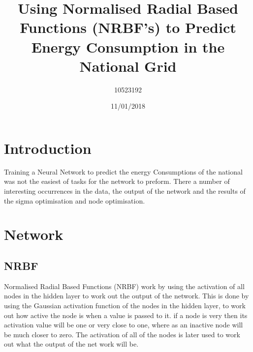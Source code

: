 \documentclass{IEEEtran}[11pt]
\title{Using Normalised Radial Based Functions (NRBF's) to Predict Energy Consumption in the National Grid}
\author{10523192}
\date{11/01/2018}
\begin{document}

\maketitle

\newpage
\section{Introduction}
\begin{flushleft}
    Training a Neural Network to predict the energy Consumptions of the national was not the easiest of tasks
    for the network to preform. There a number of interesting occurrences in the data, the output of the network and
    the results of the sigma optimisation and node optimisation.
\end{flushleft}
\section{Network}
\subsection{NRBF}
\begin{flushleft}
  Normalised Radial Based Functions (NRBF) work by using the activation of all nodes in the hidden
  layer to work out the output of the network. This is done by using the Gaussian activation function
  of the nodes in the hidden layer, to work out how active the node is when a value is passed to it.
  if a node is very then its activation value will be one or very close to one, where as an inactive
  node will be much closer to zero. The activation of all of the nodes is later used to work out what
  the output of the net work will be.
\end{flushleft}
\end{document}
